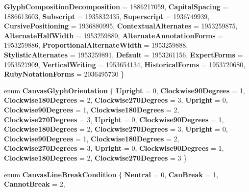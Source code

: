 \begin{DoxyCompactItemize}
{\bfseries Glyph\+Composition\+Decomposition} = 1886217059, 
\newline
{\bfseries Capital\+Spacing} = 1886613603, 
{\bfseries Subscript} = 1935832435, 
{\bfseries Superscript} = 1936749939, 
{\bfseries Cursive\+Positioning} = 1936880995, 
\newline
{\bfseries Contextual\+Alternates} = 1953259875, 
{\bfseries Alternate\+Half\+Width} = 1953259880, 
{\bfseries Alternate\+Annotation\+Forms} = 1953259886, 
{\bfseries Proportional\+Alternate\+Width} = 1953259888, 
\newline
{\bfseries Stylistic\+Alternates} = 1953259891, 
{\bfseries Default} = 1953261156, 
{\bfseries Expert\+Forms} = 1953527909, 
{\bfseries Vertical\+Writing} = 1953654134, 
\newline
{\bfseries Historical\+Forms} = 1953720680, 
{\bfseries Ruby\+Notation\+Forms} = 2036495730
 \}
\item 
\mbox{\label{namespace_microsoft_1_1_graphics_1_1_canvas_1_1_text_a6d01f61e95bc019eb180ac64876b87fe}} 
enum {\bfseries Canvas\+Glyph\+Orientation} \{ \newline
{\bfseries Upright} = 0, 
{\bfseries Clockwise90\+Degrees} = 1, 
{\bfseries Clockwise180\+Degrees} = 2, 
{\bfseries Clockwise270\+Degrees} = 3, 
\newline
{\bfseries Upright} = 0, 
{\bfseries Clockwise90\+Degrees} = 1, 
{\bfseries Clockwise180\+Degrees} = 2, 
{\bfseries Clockwise270\+Degrees} = 3, 
\newline
{\bfseries Upright} = 0, 
{\bfseries Clockwise90\+Degrees} = 1, 
{\bfseries Clockwise180\+Degrees} = 2, 
{\bfseries Clockwise270\+Degrees} = 3, 
\newline
{\bfseries Upright} = 0, 
{\bfseries Clockwise90\+Degrees} = 1, 
{\bfseries Clockwise180\+Degrees} = 2, 
{\bfseries Clockwise270\+Degrees} = 3, 
\newline
{\bfseries Upright} = 0, 
{\bfseries Clockwise90\+Degrees} = 1, 
{\bfseries Clockwise180\+Degrees} = 2, 
{\bfseries Clockwise270\+Degrees} = 3
 \}
\item 
\mbox{\label{namespace_microsoft_1_1_graphics_1_1_canvas_1_1_text_a8700477798bba01933c71dbfcf9029cd}} 
enum {\bfseries Canvas\+Line\+Break\+Condition} \{ \newline
{\bfseries Neutral} = 0, 
{\bfseries Can\+Break} = 1, 
{\bfseries Cannot\+Break} = 2, 

\end{DoxyCompactItemize}
